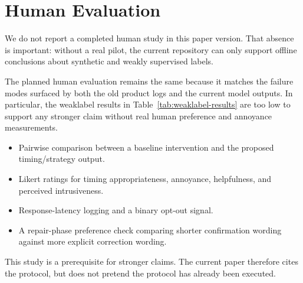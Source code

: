 \section{Human Evaluation}
We do not report a completed human study in this paper version. That absence is important: without a real pilot, the current repository can only support offline conclusions about synthetic and weakly supervised labels.

The planned human evaluation remains the same because it matches the failure modes surfaced by both the old product logs and the current model outputs. In particular, the weaklabel results in Table~\ref{tab:weaklabel-results} are too low to support any stronger claim without real human preference and annoyance measurements.
\begin{itemize}[leftmargin=1.3em]
  \item Pairwise comparison between a baseline intervention and the proposed timing/strategy output.
  \item Likert ratings for timing appropriateness, annoyance, helpfulness, and perceived intrusiveness.
  \item Response-latency logging and a binary opt-out signal.
  \item A repair-phase preference check comparing shorter confirmation wording against more explicit correction wording.
\end{itemize}

This study is a prerequisite for stronger claims. The current paper therefore cites the protocol, but does not pretend the protocol has already been executed.
